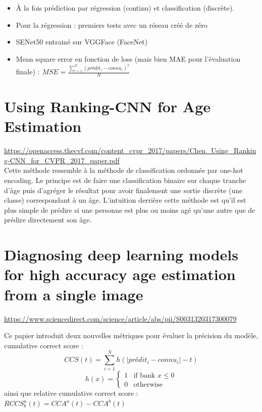 \documentclass{article}
\begin{document}
\begin{itemize}
    \item À la fois prédiction par régression (continu) et classification (discrète).
    \item Pour la régression : premiers tests avec un réseau créé de zéro
    \item SENet50 entrainé sur VGGFace (FaceNet)
    \item Mean square error en fonction de loss (mais bien MAE pour l'évaluation finale) : $MSE = \frac{\sum^{N}_{i=1}(prédit_{i}-connu_{i})^2}{N}$
\end{itemize}

\section{Using Ranking-CNN for Age Estimation}
\url{https://openaccess.thecvf.com/content_cvpr_2017/papers/Chen_Using_Ranking-CNN_for_CVPR_2017_paper.pdf} \\

Cette méthode ressemble à la méthode de classification ordonnée par one-hot encoding. Le principe est de faire une classification binaire sur chaque tranche d'âge puis d'agréger le résultat pour avoir finalement une sortie discrète (une classe) correspondant à un âge. L'intuition derrière cette méthode est qu'il est plus simple de prédire si une personne est plus ou moins agé qu'une autre que de prédire directement son âge.

\section{Diagnosing deep learning models for high accuracy age estimation from a single image}
\url{https://www.sciencedirect.com/science/article/abs/pii/S0031320317300079}

Ce papier introduit deux nouvelles métriques pour évaluer la précision du modèle, cumulative correct score :
\begin{equation}
    CCS(t) = \sum^{N}_{i=1}h(|prédit_{i}-connu_{i}|-t)
\end{equation}
\begin{equation}
    h(x) =
    \begin{cases}
      1 & \text{if bank $x \le 0$}\\
      0 & \text{otherwise}
    \end{cases}
\end{equation}
ainsi que relative cumulative correct score : $RCCS^a_b(t) = CCA^a(t) - CCA^b(t)$ \\
\end{document}
